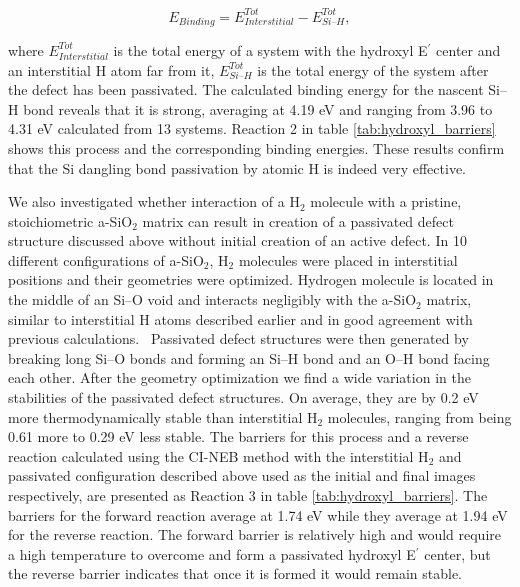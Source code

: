 \documentclass[aps,prb,reprint,superscriptaddress,showpacs]{revtex4-1}
\begin{document}
\begin{equation}
E_{Binding}=E^{Tot}_{Interstitial}-E^{Tot}_{Si\text{--}H},
\label{eq:binding}
\end{equation}

where $E^{Tot}_{Interstitial}$ is the total energy of a system with the hydroxyl E$^\prime$ center and an interstitial H atom far from it, $E^{Tot}_{Si\text{--}H}$ is the total energy of the system after the defect has been passivated. The calculated binding energy for the nascent \mbox{Si--H} bond reveals that it is strong, averaging at 4.19 eV and ranging from 3.96 to 4.31 eV calculated from 13 systems. Reaction 2 in table \ref{tab:hydroxyl_barriers} shows this process and the corresponding binding energies. These results confirm that the Si dangling bond passivation by atomic H is indeed very effective. 

We also investigated whether interaction of a H$_2$ molecule with a pristine, stoichiometric a-SiO$_2$ matrix can result in creation of a passivated defect structure discussed above without initial creation of an active defect. In 10 different configurations of a-SiO$_2$, H$_2$ molecules were placed in interstitial positions and their geometries were optimized. Hydrogen molecule is located in the middle of an \mbox{Si--O} void and interacts negligibly with the a-SiO$_2$ matrix, similar to interstitial H atoms described earlier and in good agreement with previous calculations.~\cite{BUNSON99,blochl_vacancies} Passivated defect structures were then generated by breaking long \mbox{Si--O} bonds and forming an \mbox{Si--H} bond and an \mbox{O--H} bond facing each other. After the geometry optimization we find a wide variation in the stabilities of the passivated defect structures. On average, they are by 0.2 eV more thermodynamically stable than interstitial H$_2$ molecules, ranging from being 0.61 more to 0.29 eV less stable. The barriers for this process and a reverse reaction calculated using the CI-NEB method with the interstitial H$_2$ and passivated configuration described above used as the initial and final images respectively, are presented as Reaction 3 in table \ref{tab:hydroxyl_barriers}. The barriers for the forward reaction average at 1.74 eV while they average at 1.94 eV for the reverse reaction. The forward barrier is relatively high and would require a high temperature to overcome and form a passivated hydroxyl E$^\prime$ center, but the reverse barrier indicates that once it is formed it would remain stable.
\end{document}
